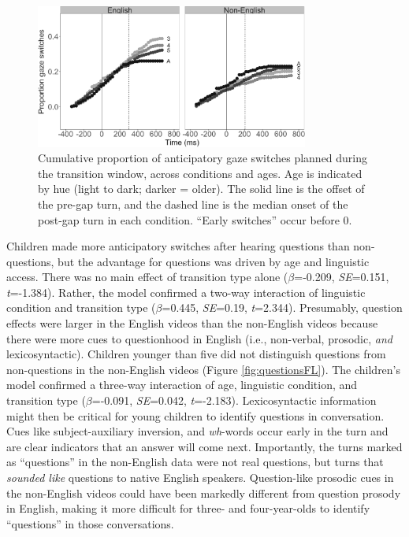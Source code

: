 \documentclass[authoryear, 12pt]{elsarticle}
\begin{document}
\begin{figure}[t]
\begin{center}
\includegraphics[width=0.8\textwidth]{figures/FIG-cumulative-FL.png}
\end{center}
\caption{Cumulative proportion of anticipatory gaze switches planned during the transition window, across conditions and ages. Age is indicated by hue (light to dark; darker = older). The solid line is the offset of the pre-gap turn, and the dashed line is the median onset of the post-gap turn in each condition. ``Early switches'' occur before 0.} 
\label{fig:cumulativeFL}
\end{figure}

Children made more anticipatory switches after hearing questions than non-questions, but the advantage for questions was driven by age and linguistic access. There was no main effect of transition type alone (\textit{$\beta$}=-0.209, \textit{SE}=0.151, \textit{t}=-1.384). Rather, the model confirmed a two-way interaction of linguistic condition and transition type (\textit{$\beta$}=0.445, \textit{SE}=0.19, \textit{t}=2.344). Presumably, question effects were larger in the English videos than the non-English videos because there were more cues to questionhood in English (i.e., non-verbal, prosodic, \textit{and} lexicosyntactic). Children younger than five did not distinguish questions from non-questions in the non-English videos (Figure \ref{fig:questionsFL}). The children's model confirmed a three-way interaction of age, linguistic condition, and transition type (\textit{$\beta$}=-0.091, \textit{SE}=0.042, \textit{t}=-2.183). Lexicosyntactic information might then be critical for young children to identify questions in conversation. Cues like subject-auxiliary inversion, and \textit{wh}-words occur early in the turn and are clear indicators that an answer will come next. Importantly, the turns marked as ``questions'' in the non-English data were not real questions, but turns that \textit{sounded like} questions to native English speakers. Question-like prosodic cues in the non-English videos could have been markedly different from question prosody in English, making it more difficult for three- and four-year-olds to identify ``questions'' in those conversations.
\end{document}

